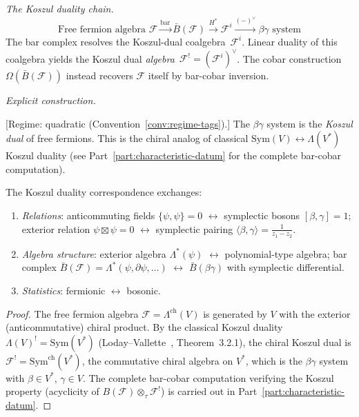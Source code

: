 \begin{example}
\label{ex:fermion-betagamma-bar-cobar}

\emph{The Koszul duality chain.}
\[\text{Free fermion algebra } \mathcal{F}
\xrightarrow{\text{bar}}
\bar{B}(\mathcal{F})
\xrightarrow{H^*}
\mathcal F^i
\xrightarrow{(-)^\vee}
\beta\gamma \text{ system}\]
The bar complex resolves the Koszul-dual coalgebra~$\mathcal F^i$.
Linear duality of this coalgebra yields the Koszul dual
\emph{algebra}~$\mathcal{F}^!=(\mathcal F^i)^\vee$. The cobar
construction $\Omega(\bar{B}(\mathcal{F}))$ instead recovers
$\mathcal{F}$ itself by bar-cobar inversion.

\emph{Explicit construction.}

\begin{theorem}\label{thm:fermion-boson-koszul}

\smallskip\noindent
\textup{[Regime: quadratic
\textup{(}Convention~\textup{\ref{conv:regime-tags}}\textup{)}.]}
The $\beta\gamma$ system is the \emph{Koszul dual} of free fermions.
This is the chiral analog of classical
$\mathrm{Sym}(V) \leftrightarrow \Lambda(V^*)$ Koszul duality
(see Part~\ref{part:characteristic-datum} for the complete bar-cobar computation).

The Koszul duality correspondence exchanges:
\begin{enumerate}
\item \emph{Relations}: anticommuting fields $\{\psi, \psi\} = 0$ $\leftrightarrow$ symplectic bosons $[\beta,\gamma] = 1$; exterior relation $\psi \boxtimes \psi = 0$ $\leftrightarrow$ symplectic pairing $\langle \beta, \gamma \rangle = \frac{1}{z_1-z_2}$.

\item \emph{Algebra structure}: exterior algebra $\Lambda^*(\psi)$ $\leftrightarrow$ polynomial-type algebra; bar complex $\bar{B}(\mathcal{F}) = \Lambda^*(\psi, \partial\psi, \ldots)$ $\leftrightarrow$ $\bar{B}(\beta\gamma)$ with symplectic differential.

\item \emph{Statistics}: fermionic $\leftrightarrow$ bosonic.
\end{enumerate}
\end{theorem}

\begin{proof}
The free fermion algebra $\mathcal{F} = \Lambda^{\mathrm{ch}}(V)$ is generated by $V$ with the exterior (anticommutative) chiral product. By the classical Koszul duality $\Lambda(V)^! = \mathrm{Sym}(V^*)$ (Loday--Vallette~\cite{LV12}, Theorem~3.2.1), the chiral Koszul dual is $\mathcal{F}^! = \mathrm{Sym}^{\mathrm{ch}}(V^*)$, the commutative chiral algebra on $V^*$, which is the $\beta\gamma$ system with $\beta \in V^*$, $\gamma \in V$. The complete bar-cobar computation verifying the Koszul property (acyclicity of $B(\mathcal{F}) \otimes_\tau \mathcal{F}^!$) is carried out in Part~\ref{part:characteristic-datum}.
\end{proof}


\end{example}
